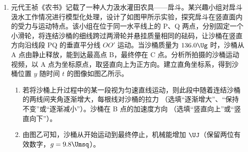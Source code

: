 \documentclass[\gkver]{gaokaozhenti}
\begin{document}
\begin{enumerate}
{A．在题图甲中标出位移为 $\frac{\sqrt{3}}{2} \Ucm$ 的质点。若波沿 $x$ 轴正方向传播则


为 Q 点，沿 $x$ 轴负方向传播则为 P 点，则波长可能为 $\frac{1}{6}\lambda = 3 \Um$，即 $\lambda = 18 \Um$；或 $\frac{1}{3}\lambda' = 3 \Um$，即 $\lambda' = 9 \Um$。故 A 错误；

C．根据 $v = \frac{\lambda}{T}$，可得 $v = 7.5 \Ums$，$v' = 3.75 \Ums$。故 C 错误；

D．根据题图乙计算该质点在 $2 \Us$ 内运动的路程为 $s = \left(1 + 1 + 1 + 1 - \frac{\sqrt{3}}{2}\right) \Ucm = \left(4 - \frac{\sqrt{3}}{2}\right) \Ucm$。故 D 正确。

故选 BD。
}

\item
元代王祯《农书》记载了一种人力汲水灌田农具——戽斗。某兴趣小组对戽斗汲水工作情况进行模型化处理，设计了如图甲所示实验，探究戽斗在竖直面内的受力与运动特点。该小组在位于同一水平线上的 P、Q 两点，分别固定一个小滑轮，将连结沙桶的细线跨过两滑轮并悬挂质量相同的砝码，让沙桶在竖直方向沿线段 PQ 的垂直平分线 $OO'$ 运动。当沙桶质量为 $136.0 \Ug$ 时，沙桶从 A 点由静止释放，能到达最高点 B，最终停在 C 点。分析所拍摄的沙桶运动视频，以 A 点为坐标原点，取竖直向上为正方向。建立直角坐标系，得到沙桶位置 $y$ 随时间 $t$ 的图像如图乙所示。
\begin{enumerate}
	\item
	若将沙桶上升过程中的某一段视为匀速直线运动，则此段中随着连结沙桶的两线间夹角逐渐增大，每根线对沙桶的拉力 （选填“逐渐增大”、“保持不变”或“逐渐减小”）。沙桶在 B 点的加速度方向 （选填“竖直向上”或“竖直向下”）。
	\item
	由图乙可知，沙桶从开始运动到最终停止，机械能增加  $\UJ$（保留两位有效数字，$g = 9.8 \Umsq$）。
\end{enumerate}
\end{enumerate}
\end{document}
